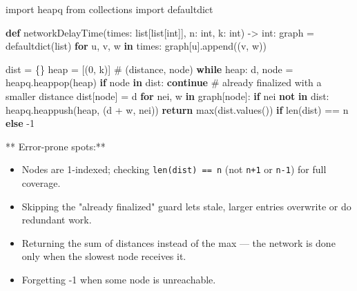 \documentclass[11pt]{article}
\providecommand{\tightlist}{\setlength{\itemsep}{1pt}\setlength{\parskip}{0pt}}
\newenvironment{Shaded}{\begin{snugshade}}{\end{snugshade}}
\newcommand{\BuiltInTok}[1]{\textcolor[rgb]{0.50,0.55,0.55}{#1}}
\newcommand{\CommentTok}[1]{\textcolor[rgb]{0.48,0.49,0.49}{#1}}
\newcommand{\ControlFlowTok}[1]{\textcolor[rgb]{0.99,0.74,0.29}{\textbf{#1}}}
\newcommand{\DecValTok}[1]{\textcolor[rgb]{0.96,0.45,0.00}{#1}}
\newcommand{\ImportTok}[1]{\textcolor[rgb]{0.15,0.68,0.38}{#1}}
\newcommand{\KeywordTok}[1]{\textcolor[rgb]{0.81,0.81,0.76}{\textbf{#1}}}
\newcommand{\NormalTok}[1]{\textcolor[rgb]{0.81,0.81,0.76}{#1}}
\newcommand{\OperatorTok}[1]{\textcolor[rgb]{0.81,0.81,0.76}{#1}}
\begin{document}
\begin{Shaded}
\begin{Highlighting}[]
\ImportTok{import}\NormalTok{ heapq}
\ImportTok{from}\NormalTok{ collections }\ImportTok{import}\NormalTok{ defaultdict}

\KeywordTok{def}\NormalTok{ networkDelayTime(times: }\BuiltInTok{list}\NormalTok{[}\BuiltInTok{list}\NormalTok{[}\BuiltInTok{int}\NormalTok{]], n: }\BuiltInTok{int}\NormalTok{, k: }\BuiltInTok{int}\NormalTok{) }\OperatorTok{{-}\textgreater{}} \BuiltInTok{int}\NormalTok{:}
\NormalTok{    graph }\OperatorTok{=}\NormalTok{ defaultdict(}\BuiltInTok{list}\NormalTok{)}
    \ControlFlowTok{for}\NormalTok{ u, v, w }\KeywordTok{in}\NormalTok{ times:}
\NormalTok{        graph[u].append((v, w))}

\NormalTok{    dist }\OperatorTok{=}\NormalTok{ \{\}}
\NormalTok{    heap }\OperatorTok{=}\NormalTok{ [(}\DecValTok{0}\NormalTok{, k)]  }\CommentTok{\# (distance, node)}
    \ControlFlowTok{while}\NormalTok{ heap:}
\NormalTok{        d, node }\OperatorTok{=}\NormalTok{ heapq.heappop(heap)}
        \ControlFlowTok{if}\NormalTok{ node }\KeywordTok{in}\NormalTok{ dist:}
            \ControlFlowTok{continue}          \CommentTok{\# already finalized with a smaller distance}
\NormalTok{        dist[node] }\OperatorTok{=}\NormalTok{ d}
        \ControlFlowTok{for}\NormalTok{ nei, w }\KeywordTok{in}\NormalTok{ graph[node]:}
            \ControlFlowTok{if}\NormalTok{ nei }\KeywordTok{not} \KeywordTok{in}\NormalTok{ dist:}
\NormalTok{                heapq.heappush(heap, (d }\OperatorTok{+}\NormalTok{ w, nei))}
    \ControlFlowTok{return} \BuiltInTok{max}\NormalTok{(dist.values()) }\ControlFlowTok{if} \BuiltInTok{len}\NormalTok{(dist) }\OperatorTok{==}\NormalTok{ n }\ControlFlowTok{else} \OperatorTok{{-}}\DecValTok{1}
\end{Highlighting}
\end{Shaded}

** Error-prone spots:**

\begin{itemize}
\tightlist
\item
  Nodes are 1-indexed; checking \texttt{len(dist)\ ==\ n} (not \texttt{n+1} or \texttt{n-1}) for full coverage.
\item
  Skipping the "already finalized" guard lets stale, larger entries overwrite or do redundant work.
\item
  Returning the sum of distances instead of the max --- the network is done only when the slowest node receives it.
\item
  Forgetting -1 when some node is unreachable.
\end{itemize}
\end{document}
